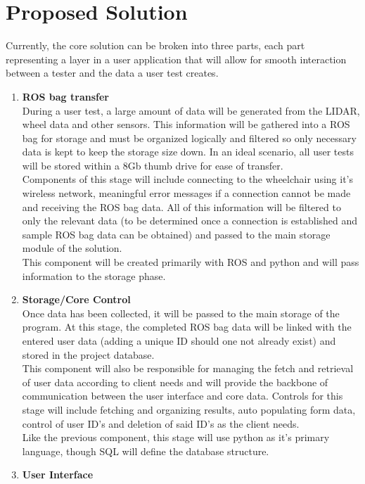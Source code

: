 \documentclass[onecolumn, draftclsnofoot,10pt, compsoc]{IEEEtran}
\begin{document}
\section{Proposed Solution}
Currently, the core solution can be broken into three parts, each part representing a layer in a user application that will allow for smooth interaction between a tester and the data a user test creates. 
\begin{enumerate}
	\item \textbf{ROS bag transfer}\\
	During a user test, a large amount of data will be generated from the LIDAR, wheel data and other sensors. This information will be gathered into a ROS bag for storage and must be organized logically and filtered so only necessary data is kept to keep the storage size down. In an ideal scenario, all user tests will be stored within a 8Gb thumb drive for ease of transfer.\\
	Components of this stage will include connecting to the wheelchair using it's wireless network, meaningful error messages if a connection cannot be made and receiving the ROS bag data. All of this information will be filtered to only the relevant data (to be determined once a connection is established and sample ROS bag data can be obtained) and passed to the main storage module of the solution.\\ 
	This component will be created primarily with ROS and python and will pass information to the storage phase. \\
	\item \textbf{Storage/Core Control}\\
	Once data has been collected, it will be passed to the main storage of the program. At this stage, the completed ROS bag data will be linked with the entered user data (adding a unique ID should one not already exist) and stored in the project database.\\
	This component will also be responsible for managing the fetch and retrieval of user data according to client needs and will provide the backbone of communication between the user interface and core data. Controls for this stage will include fetching and organizing results, auto populating form data, control of user ID's and deletion of said ID's as the client needs. \\
	Like the previous component, this stage will use python as it's primary language, though SQL will define the database structure. \\ 
	\item \textbf{User Interface}\\

\end{enumerate}
\end{document}

